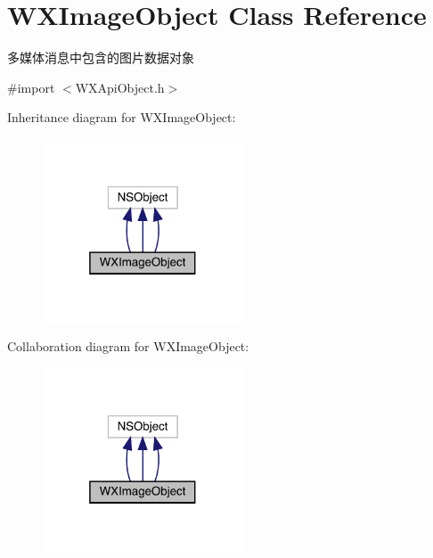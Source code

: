 \hypertarget{interface_w_x_image_object}{}\section{W\+X\+Image\+Object Class Reference}
\label{interface_w_x_image_object}


多媒体消息中包含的图片数据对象  




{\ttfamily \#import $<$W\+X\+Api\+Object.\+h$>$}



Inheritance diagram for W\+X\+Image\+Object\+:\nopagebreak
\begin{figure}[H]
\begin{center}
\leavevmode
\includegraphics[width=169pt]{interface_w_x_image_object__inherit__graph}
\end{center}
\end{figure}


Collaboration diagram for W\+X\+Image\+Object\+:\nopagebreak
\begin{figure}[H]
\begin{center}
\leavevmode
\includegraphics[width=169pt]{interface_w_x_image_object__coll__graph}
\end{center}
\end{figure}
